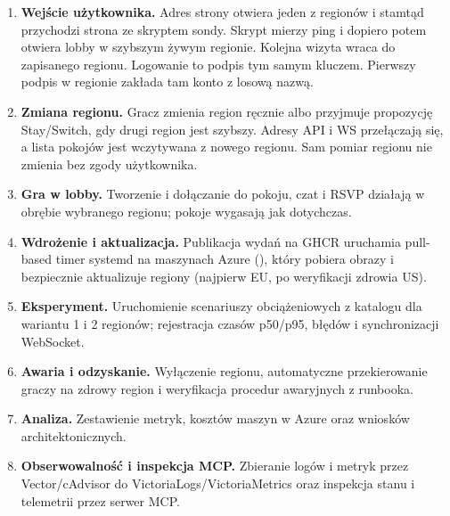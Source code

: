 \documentclass[12pt,a4paper]{article}
\newcommand{\code}[1]{\texttt{\detokenize{#1}}}
\begin{document}
\begin{enumerate}[label=\textbf{P\arabic*.},leftmargin=2.2em]
  \item \textbf{Wejście użytkownika.} Adres strony otwiera jeden z regionów
        i stamtąd przychodzi strona ze skryptem sondy. Skrypt mierzy ping i dopiero
        potem otwiera lobby w szybszym żywym regionie. Kolejna wizyta wraca do
        zapisanego regionu. Logowanie to podpis tym samym kluczem.
        Pierwszy podpis w regionie zakłada tam konto z losową nazwą.
  \item \textbf{Zmiana regionu.} Gracz zmienia region ręcznie albo przyjmuje
        propozycję Stay/Switch, gdy drugi region jest szybszy. Adresy API i WS przełączają się,
        a lista pokojów jest wczytywana z nowego regionu. Sam pomiar regionu nie zmienia bez zgody użytkownika.
  \item \textbf{Gra w lobby.} Tworzenie i dołączanie do pokoju, czat i RSVP
        działają w obrębie wybranego regionu; pokoje wygasają jak dotychczas.
  \item \textbf{Wdrożenie i aktualizacja.} Publikacja wydań na GHCR uruchamia pull-based timer systemd na maszynach Azure (\code{deploy/update.sh}), który pobiera obrazy i bezpiecznie aktualizuje regiony (najpierw EU, po weryfikacji zdrowia US).
  \item \textbf{Eksperyment.} Uruchomienie scenariuszy obciążeniowych z katalogu \code{experiments/f4/} dla wariantu 1 i 2 regionów; rejestracja czasów p50/p95, błędów i synchronizacji WebSocket.
  \item \textbf{Awaria i odzyskanie.} Wyłączenie regionu, automatyczne przekierowanie graczy na zdrowy region i weryfikacja procedur awaryjnych z runbooka.
  \item \textbf{Analiza.} Zestawienie metryk, kosztów maszyn w Azure oraz wniosków architektonicznych.
  \item \textbf{Obserwowalność i inspekcja MCP.} Zbieranie logów i metryk przez Vector/cAdvisor do VictoriaLogs/VictoriaMetrics oraz inspekcja stanu i telemetrii przez serwer MCP.
\end{enumerate}
\end{document}
